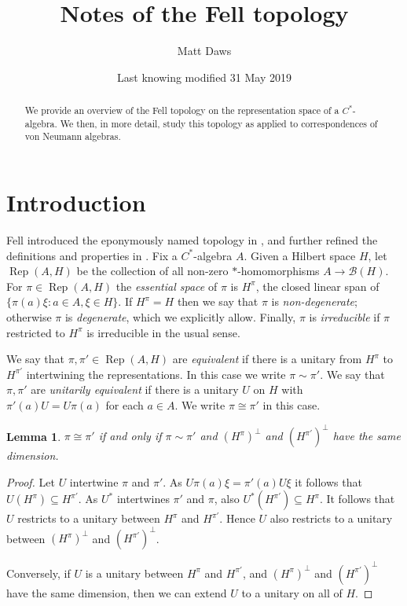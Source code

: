 \documentclass[a4paper,11pt]{article}
\title{Notes of the Fell topology}
\author{Matt Daws}
\date{Last knowing modified 31 May 2019}
\newcommand{\mc}[1]{{\mathcal{#1}}}
\newcommand{\Rep}{\operatorname{Rep}}
\newtheorem{lemma}{Lemma}[section]
\begin{document}
\maketitle

\begin{abstract}
We provide an overview of the Fell topology on the representation space of a
$C^*$-algebra.  We then, in more detail, study this topology as applied to
correspondences of von Neumann algebras.
\end{abstract}

\section{Introduction}

Fell introduced the eponymously named topology in \cite{fell1}, and further
refined the definitions and properties in \cite{fell2}.  Fix a $C^*$-algebra
$A$.  Given a Hilbert space $H$, let $\Rep(A,H)$ be the collection of all
non-zero $*$-homomorphisms $A\rightarrow\mc B(H)$.  For $\pi\in\Rep(A,H)$ the
\emph{essential space} of $\pi$ is $H^\pi$, the closed linear span of
$\{\pi(a)\xi : a\in A, \xi\in H\}$.  If $H^\pi = H$ then we say that $\pi$
is \emph{non-degenerate}; otherwise $\pi$ is \emph{degenerate}, which we
explicitly allow.  Finally, $\pi$ is \emph{irreducible} if $\pi$ restricted
to $H^\pi$ is irreducible in the usual sense.

We say that $\pi,\pi'\in\Rep(A,H)$ are \emph{equivalent} if there is a unitary
from $H^\pi$ to $H^{\pi'}$ intertwining the representations.  In this case we
write $\pi \sim \pi'$. We say that
$\pi,\pi'$ are \emph{unitarily equivalent} if there is a unitary $U$ on $H$
with $\pi'(a) U = U \pi(a)$ for each $a\in A$.  We write $\pi\cong\pi'$ in
this case.

\begin{lemma}
$\pi\cong\pi'$ if and only if $\pi\sim\pi'$ and $(H^\pi)^\perp$ and 
$(H^{\pi'})^\perp$ have the same dimension.
\end{lemma}
\begin{proof}
Let $U$ intertwine $\pi$ and $\pi'$.
As $U\pi(a)\xi = \pi'(a)U\xi$ it follows that $U(H^\pi) \subseteq H^{\pi'}$.
As $U^*$ intertwines $\pi'$ and $\pi$, also $U^*(H^{\pi'}) \subseteq H^\pi$.
It follows that $U$ restricts to a unitary between $H^\pi$ and $H^{\pi'}$.
Hence $U$ also restricts to a unitary between $(H^\pi)^\perp$ and 
$(H^{\pi'})^\perp$.

Conversely, if $U$ is a unitary between $H^\pi$ and $H^{\pi'}$, and
$(H^\pi)^\perp$ and $(H^{\pi'})^\perp$ have the same dimension, then
we can extend $U$ to a unitary on all of $H$.
\end{proof}
\end{document}
